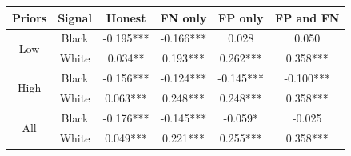 \begin{tabular}{cccccc} \hline \hline
\textbf{Priors}&\textbf{Signal}&\textbf{Honest}&\textbf{FN only}&\textbf{FP only}&\textbf{FP and FN}\\ \hline
\multirow{2}{*}{Low}&Black&-0.195***&-0.166***&0.028&0.050\\
&White&0.034**&0.193***&0.262***&0.358***\\
\multirow{2}{*}{High}&Black&-0.156***&-0.124***&-0.145***&-0.100***\\
&White&0.063***&0.248***&0.248***&0.358***\\
\multirow{2}{*}{All}&Black&-0.176***&-0.145***&-0.059*&-0.025\\
&White&0.049***&0.221***&0.255***&0.358***\\
\hline \end{tabular}
